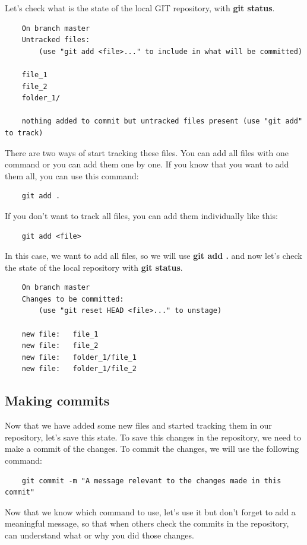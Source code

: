 \documentclass{article}
\begin{document}
Let's check what is the state of the local GIT repository, with \textbf{git status}.

\begin{lstlisting}
	On branch master
	Untracked files:
		(use "git add <file>..." to include in what will be committed)

	file_1
	file_2
	folder_1/

	nothing added to commit but untracked files present (use "git add" to track)
\end{lstlisting}

There are two ways of start tracking these files. You can add all files with one command or you can add them one by one. If you know that you want to add them all, you can use this command:

\begin{lstlisting}
	git add .
\end{lstlisting}

If you don't want to track all files, you can add them individually like this:

\begin{lstlisting}
	git add <file>
\end{lstlisting}

In this case, we want to add all files, so we will use \textbf{git add .} and now let's check the state of the local repository with \textbf{git status}.

\begin{lstlisting}
	On branch master
	Changes to be committed:
  		(use "git reset HEAD <file>..." to unstage)

	new file:   file_1
	new file:   file_2
	new file:   folder_1/file_1
	new file:   folder_1/file_2
\end{lstlisting}

\subsection{Making commits}

Now that we have added some new files and started tracking them in our repository, let's save this state. To save this changes in the repository, we need to make a commit of the changes. To commit the changes, we will use the following command:

\begin{lstlisting}
	git commit -m "A message relevant to the changes made in this commit"
\end{lstlisting}

Now that we know which command to use, let's use it but don't forget to add a meaningful message, so that when others check the commits in the repository, can understand what or why you did those changes.\\
\end{document}
